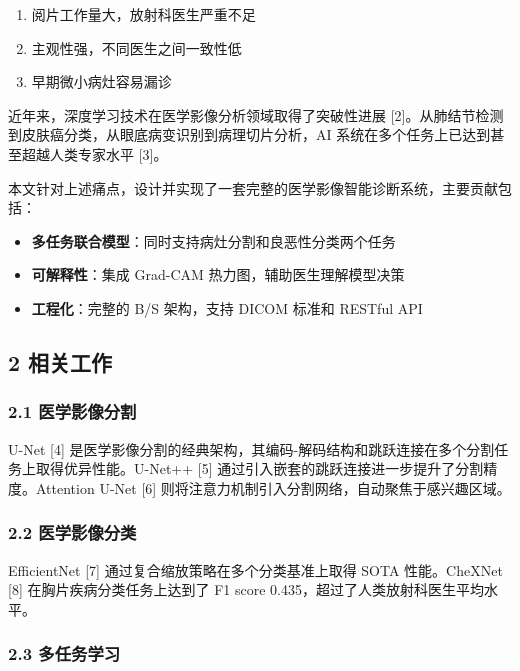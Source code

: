 \documentclass{harryopo-mathnotes}
\begin{document}
\begin{enumerate}
\def\labelenumi{\arabic{enumi}.}
\tightlist
\item
  阅片工作量大，放射科医生严重不足
\item
  主观性强，不同医生之间一致性低
\item
  早期微小病灶容易漏诊
\end{enumerate}

近年来，深度学习技术在医学影像分析领域取得了突破性进展
{[}2{]}。从肺结节检测到皮肤癌分类，从眼底病变识别到病理切片分析，AI
系统在多个任务上已达到甚至超越人类专家水平 {[}3{]}。

本文针对上述痛点，设计并实现了一套完整的医学影像智能诊断系统，主要贡献包括：

\begin{itemize}
\tightlist
\item
  \textbf{多任务联合模型}：同时支持病灶分割和良恶性分类两个任务
\item
  \textbf{可解释性}：集成 Grad-CAM 热力图，辅助医生理解模型决策
\item
  \textbf{工程化}：完整的 B/S 架构，支持 DICOM 标准和 RESTful API
\end{itemize}

\subsection{2 相关工作}\label{ux76f8ux5173ux5de5ux4f5c}

\subsubsection{2.1
医学影像分割}\label{ux533bux5b66ux5f71ux50cfux5206ux5272}

U-Net {[}4{]}
是医学影像分割的经典架构，其编码-解码结构和跳跃连接在多个分割任务上取得优异性能。U-Net++
{[}5{]} 通过引入嵌套的跳跃连接进一步提升了分割精度。Attention U-Net
{[}6{]} 则将注意力机制引入分割网络，自动聚焦于感兴趣区域。

\subsubsection{2.2
医学影像分类}\label{ux533bux5b66ux5f71ux50cfux5206ux7c7b}

EfficientNet {[}7{]} 通过复合缩放策略在多个分类基准上取得 SOTA
性能。CheXNet {[}8{]} 在胸片疾病分类任务上达到了 F1 score
0.435，超过了人类放射科医生平均水平。

\subsubsection{2.3 多任务学习}\label{ux591aux4efbux52a1ux5b66ux4e60}
\end{document}
